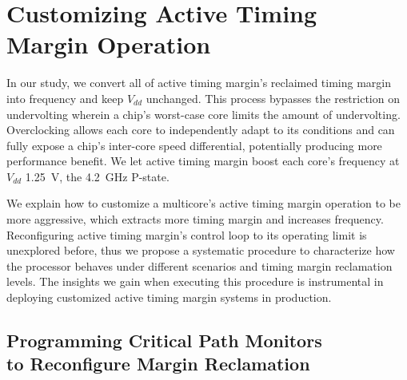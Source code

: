 \section{Customizing Active Timing \\Margin Operation}
\label{sec:process:configurability}

In our study, we convert all of active timing margin's reclaimed timing margin into frequency and keep $V_{dd}$ unchanged. This process bypasses the restriction on undervolting wherein a chip's worst-case core limits the amount of undervolting. Overclocking allows each core to independently adapt to its conditions and can fully expose a chip's inter-core speed differential, potentially producing more performance benefit. We let active timing margin boost each core's frequency at $V_{dd}$ 1.25~V, the 4.2~GHz P-state.

We explain how to customize a multicore's active timing margin operation to be more aggressive, which extracts more timing margin and increases frequency. Reconfiguring active timing margin's control loop to its operating limit is unexplored before, thus we propose a systematic procedure to characterize how the processor behaves under different scenarios and timing margin reclamation levels. The insights we gain when executing this procedure is instrumental in deploying customized active timing margin systems in production.


\subsection{Programming Critical Path Monitors \\to Reconfigure Margin Reclamation}
\label{sec:process:configurability:howto}

